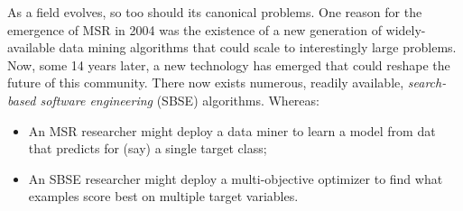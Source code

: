 \documentclass[table, xcdraw, sigconf,review, anonymous]{acmart}
\begin{document}
As a field evolves, so too should its canonical problems. One  reason for the emergence of   MSR  in 2004 was the existence of a new generation of widely-available data mining
algorithms that could scale to interestingly large problems.  Now, some 14 years later, a new technology has emerged that could reshape the future of this community. There now exists numerous, readily
available, {\em search-based software engineering} (SBSE) algorithms. Whereas:
\begin{itemize}
\item
An MSR researcher might deploy a
data miner to learn a model from  dat   that predicts for (say) a single target class;
\item
An SBSE researcher might deploy a multi-objective optimizer
to find what examples score best
on multiple target variables.
\end{itemize}
\end{document}

